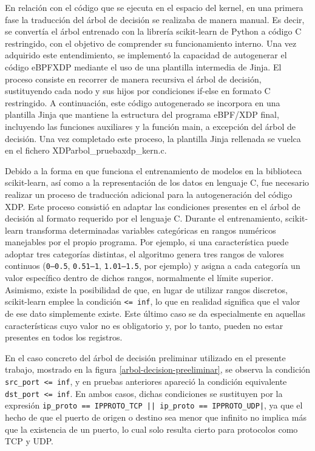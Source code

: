 
En relación con el código que se ejecuta en el espacio del kernel, en una primera fase la traducción del árbol de decisión se realizaba de manera manual. Es decir, se convertía el árbol entrenado con la librería scikit-learn de Python a código C restringido, con el objetivo de comprender su funcionamiento interno. Una vez adquirido este entendimiento, se implementó la capacidad de autogenerar el código eBPF\/XDP mediante el uso de una plantilla intermedia de Jinja. El proceso consiste en recorrer de manera recursiva el árbol de decisión, sustituyendo cada nodo y sus hijos por condiciones if-else en formato C restringido. A continuación, este código autogenerado se incorpora en una plantilla Jinja que mantiene la estructura del programa eBPF/XDP final, incluyendo las funciones auxiliares y la función main, a excepción del árbol de decisión. Una vez completado este proceso, la plantilla Jinja rellenada se vuelca en el fichero XDP\/arbol\_prueba\/xdp\_kern.c.

Debido a la forma en que funciona el entrenamiento de modelos en la biblioteca scikit-learn, así como a la representación de los datos en lenguaje C, fue necesario realizar un proceso de traducción adicional para la autogeneración del código XDP. Este proceso consistió en adaptar las condiciones presentes en el árbol de decisión al formato requerido por el lenguaje C. Durante el entrenamiento, scikit-learn transforma determinadas variables categóricas en rangos numéricos manejables por el propio programa. Por ejemplo, si una característica puede adoptar tres categorías distintas, el algoritmo genera tres rangos de valores continuos (\verb|0–0.5|, \verb|0.51–1|, \verb|1.01–1.5|, por ejemplo) y asigna a cada categoría un valor específico dentro de dichos rangos, normalmente el límite superior. Asimismo, existe la posibilidad de que, en lugar de utilizar rangos discretos, scikit-learn emplee la condición \verb|<= inf|, lo que en realidad significa que el valor de ese dato simplemente existe. Este último caso se da especialmente en aquellas características cuyo valor no es obligatorio y, por lo tanto, pueden no estar presentes en todos los registros.

En el caso concreto del árbol de decisión preliminar utilizado en el presente trabajo, mostrado en la figura \ref{arbol-decision-preeliminar}, se observa la condición \verb|src_port <= inf|, y en pruebas anteriores apareció la condición equivalente \verb|dst_port <= inf|. En ambos casos, dichas condiciones se sustituyen por la expresión \verb#ip_proto == IPPROTO_TCP || ip_proto == IPPROTO_UDP|#, ya que el hecho de que el puerto de origen o destino sea menor que infinito no implica más que la existencia de un puerto, lo cual solo resulta cierto para protocolos como TCP y UDP.

